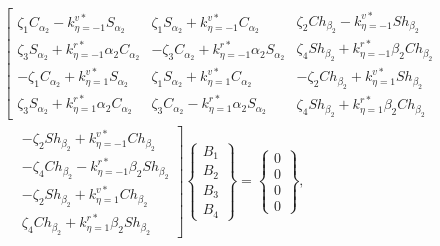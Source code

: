 \documentclass[preprint,12pt]{elsarticle}
\begin{document}
\begin{equation}\label{eq:ABy}
	\begin{split}
		&\left[ \begin{array}{c}
			\zeta_1C_{\alpha_2}-k^{v*}_{\eta=-1}S_{\alpha_2} \\ \zeta_3S_{\alpha_2}+k^{r*}_{\eta=-1}\alpha_2C_{\alpha_2} \\ -\zeta_1C_{\alpha_2}+k^{v*}_{\eta=1}S_{\alpha_2} \\ \zeta_3S_{\alpha_2}+k^{r*}_{\eta=1}\alpha_2C_{\alpha_2}
		\end{array} \begin{array}{c}
			\zeta_1S_{\alpha_2}+k^{v*}_{\eta=-1}C_{\alpha_2} \\ -\zeta_3C_{\alpha_2}+k^{r*}_{\eta=-1}\alpha_2S_{\alpha_2} \\ \zeta_1S_{\alpha_2}+k^{v*}_{\eta=1}C_{\alpha_2} \\ \zeta_3C_{\alpha_2}-k^{r*}_{\eta=1}\alpha_2S_{\alpha_2}
		\end{array} \begin{array}{c}
			\zeta_2Ch_{\beta_2}-k^{v*}_{\eta=-1}Sh_{\beta_2} \\ \zeta_4Sh_{\beta_2}+k^{r*}_{\eta=-1}\beta_2Ch_{\beta_2} \\ -\zeta_2Ch_{\beta_2}+k^{v*}_{\eta=1}Sh_{\beta_2} \\ \zeta_4Sh_{\beta_2}+k^{r*}_{\eta=1}\beta_2Ch_{\beta_2}
		\end{array} \right. \\
		&\quad
		\left. \begin{array}{c}
			-\zeta_2Sh_{\beta_2}+k^{v*}_{\eta=-1}Ch_{\beta_2} \\ -\zeta_4Ch_{\beta_2}-k^{r*}_{\eta=-1}\beta_2Sh_{\beta_2} \\ -\zeta_2Sh_{\beta_2}+k^{v*}_{\eta=1}Ch_{\beta_2} \\ \zeta_4Ch_{\beta_2}+k^{r*}_{\eta=1}\beta_2Sh_{\beta_2}
		\end{array} \right]\begin{Bmatrix}
			B_1\\B_2\\B_3\\B_4
		\end{Bmatrix}=\begin{Bmatrix}
			0\\0\\0\\0
		\end{Bmatrix},
	\end{split}
\end{equation}
\end{document}
